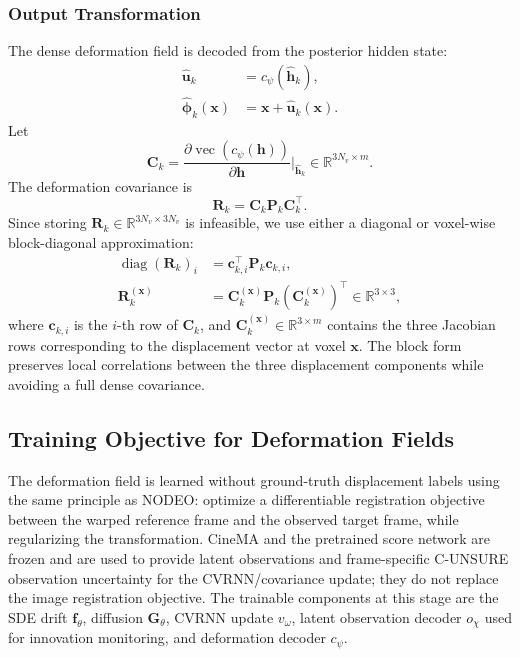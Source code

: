 \documentclass[10pt,twocolumn]{article}
\newcommand{\R}{\mathbb{R}}
\begin{document}
\subsubsection{Output Transformation}

The dense deformation field is decoded from the posterior hidden state:
\begin{align}
    \widehat{\bm{u}}_k &= c_\psi(\hat{\bm{h}}_k), \\
    \hat{\bm{\phi}}_k(\bm{x}) &= \bm{x} + \widehat{\bm{u}}_k(\bm{x}).
    \label{eq:output_mean}
\end{align}
Let
\begin{equation}
    \bm{C}_k =
    \frac{\partial \operatorname{vec}(c_\psi(\bm{h}))}
         {\partial \bm{h}}
    \bigg|_{\hat{\bm{h}}_k}
    \in \R^{3N_v\times m}.
    \label{eq:def_jac}
\end{equation}
The deformation covariance is
\begin{equation}
    \boxed{\bm{R}_k = \bm{C}_k \bm{P}_k \bm{C}_k^\top.}
    \label{eq:output_cov}
\end{equation}
Since storing $\bm{R}_k\in\R^{3N_v\times3N_v}$ is infeasible, we use either a diagonal or voxel-wise block-diagonal approximation:
\begin{align}
    \operatorname{diag}(\bm{R}_k)_i
    &= \bm{c}_{k,i}^\top \bm{P}_k \bm{c}_{k,i}, \label{eq:def_cov_diag}\\
    \bm{R}_k^{(\bm{x})}
    &=
    \bm{C}_k^{(\bm{x})}\bm{P}_k(\bm{C}_k^{(\bm{x})})^\top
    \in\R^{3\times3},
    \label{eq:def_cov_block}
\end{align}
where $\bm{c}_{k,i}$ is the $i$-th row of $\bm{C}_k$, and $\bm{C}_k^{(\bm{x})}\in\R^{3\times m}$ contains the three Jacobian rows corresponding to the displacement vector at voxel $\bm{x}$. The block form preserves local correlations between the three displacement components while avoiding a full dense covariance.

\subsection{Training Objective for Deformation Fields}
\label{sec:deformation_training_objective}

The deformation field is learned without ground-truth displacement labels using the same principle as NODEO: optimize a differentiable registration objective between the warped reference frame and the observed target frame, while regularizing the transformation. CineMA and the pretrained score network are frozen and are used to provide latent observations and frame-specific C-UNSURE observation uncertainty for the CVRNN/covariance update; they do not replace the image registration objective. The trainable components at this stage are the SDE drift $\bm{f}_\theta$, diffusion $\bm{G}_\theta$, CVRNN update $v_\omega$, latent observation decoder $o_\chi$ used for innovation monitoring, and deformation decoder $c_\psi$.
\end{document}
